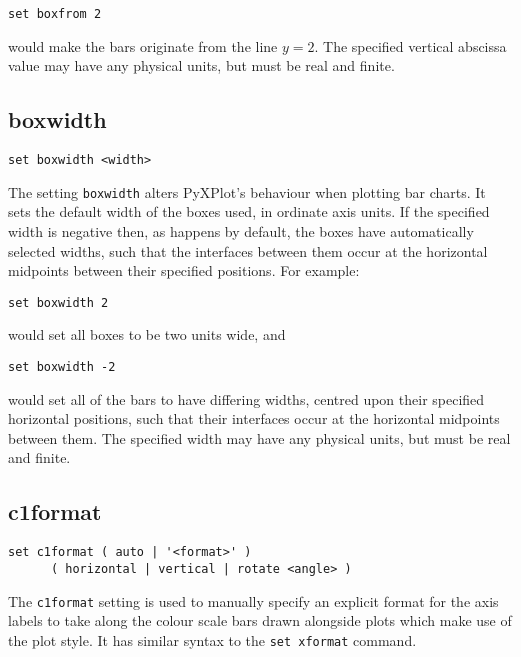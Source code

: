 \begin{verbatim}
set boxfrom 2
\end{verbatim}

\noindent would make the bars originate from the line $y=2$. The specified
vertical abscissa value may have any physical units, but must be real and
finite.



\subsection{boxwidth}

\begin{verbatim}
set boxwidth <width>
\end{verbatim}

The setting {\tt boxwidth} alters PyXPlot's behaviour when plotting bar charts.
It sets the default width of the boxes used, in ordinate axis units.  If the
specified width is negative then, as happens by default, the boxes have
automatically selected widths, such that the interfaces between them occur at
the horizontal midpoints between their specified positions.  For example:

\begin{verbatim}
set boxwidth 2
\end{verbatim}

\noindent would set all boxes to be two units wide, and

\begin{verbatim}
set boxwidth -2
\end{verbatim}

\noindent would set all of the bars to have differing widths, centred upon
their specified horizontal positions, such that their interfaces occur at the
horizontal midpoints between them. The specified width may have any physical
units, but must be real and finite.


\subsection{c1format}

\begin{verbatim}
set c1format ( auto | '<format>' )
      ( horizontal | vertical | rotate <angle> )
\end{verbatim}

The {\tt c1format} setting is used to manually specify an explicit format for
the axis labels to take along the colour scale bars drawn alongside plots which
make use of the  plot style. It has similar syntax to the
{\tt set xformat} command.

